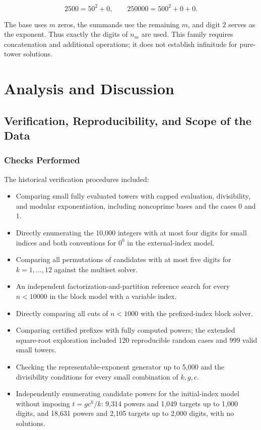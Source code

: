\documentclass[11pt,a4paper]{article}
\begin{document}
\[
2500=50^2+0,\qquad 250000=500^2+0+0.
\]

The base uses $m$ zeros, the summands use the remaining $m$, and digit $2$ serves as the exponent. Thus exactly the digits of $n_m$ are used. This family requires concatenation and additional operations; it does not establish infinitude for pure-tower solutions.

\section{Analysis and Discussion}

\subsection{Verification, Reproducibility, and Scope of the Data}

\subsubsection{Checks Performed}

The historical verification procedures included:

\begin{itemize}
\item Comparing small fully evaluated towers with capped evaluation, divisibility, and modular exponentiation, including noncoprime bases and the cases $0$ and $1$.
\item Directly enumerating the 10,000 integers with at most four digits for small indices and both conventions for $0^0$ in the external-index model.
\item Comparing all permutations of candidates with at most five digits for $k=1,\ldots,12$ against the multiset solver.
\item An independent factorization-and-partition reference search for every $n<10000$ in the block model with a variable index.
\item Directly comparing all cuts of $n<1000$ with the prefixed-index block solver.
\item Comparing certified prefixes with fully computed powers; the extended square-root exploration included 120 reproducible random cases and 999 valid small towers.
\item Checking the representable-exponent generator up to 5,000 and the divisibility conditions for every small combination of $k,g,c$.
\item Independently enumerating candidate powers for the initial-index model without imposing $t=gc^h/k$: 9,314 powers and 1,049 targets up to 1,000 digits, and 18,631 powers and 2,105 targets up to 2,000 digits, with no solutions.
\end{itemize}
\end{document}
